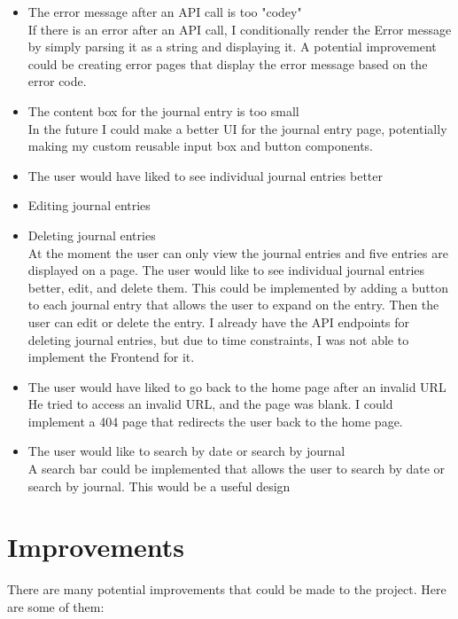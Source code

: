 \begin{itemize}
    \item The error message after an API call is too "codey" \\
    If there is an error after an API call, I conditionally render the Error message by simply parsing it as a string and displaying it. A potential improvement could be creating error pages that display the error message based on the error code.

    \item The content box for the journal entry is too small \\
    In the future I could make a better UI for the journal entry page, potentially making my custom reusable input box and button components.

    \item The user would have liked to see individual journal entries better
    \item Editing journal entries
    \item Deleting journal entries \\
    At the moment the user can only view the journal entries and five entries are displayed on a page. The user would like to see individual journal entries better, edit, and delete them. This could be implemented by adding a button to each journal entry that allows the user to expand on the entry. Then the user can edit or delete the entry. I already have the API endpoints for deleting journal entries, but due to time constraints, I was not able to implement the Frontend for it.


    \item The user would have liked to go back to the home page after an invalid URL \\
    He tried to access an invalid URL, and the page was blank. I could implement a 404 page that redirects the user back to the home page.

    \item The user would like to search by date or search by journal \\
    A search bar could be implemented that allows the user to search by date or search by journal. This would be a useful design
\end{itemize}



\section{Improvements}
There are many potential improvements that could be made to the project. Here are some of them:

